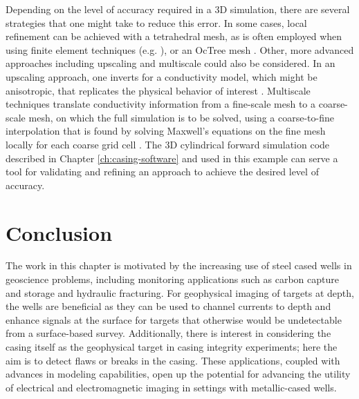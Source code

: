 Depending on the level of accuracy required in a 3D simulation, there are several strategies that one might take to reduce this error. In some cases, local refinement can be achieved with a tetrahedral mesh, as is often employed when using finite element techniques (e.g. \cite{Weiss2016}), or an OcTree mesh \citep{Haber2007}. Other, more advanced approaches including upscaling and multiscale could also be considered. In an upscaling approach, one inverts for a conductivity model, which might be anisotropic, that replicates the physical behavior of interest \citep{Caudillo-Mata2017}. Multiscale techniques translate conductivity information from a fine-scale mesh to a coarse-scale mesh, on which the full simulation is to be solved, using a coarse-to-fine interpolation that is found by solving Maxwell's equations on the fine mesh locally for each coarse grid cell \citep{Haber2014, Caudillo-Mata2017a}. The 3D cylindrical forward simulation code described in Chapter \ref{ch:casing-software} and used in this example can serve a tool for validating and refining an approach to achieve the desired level of accuracy.

\section{Conclusion}
The work in this chapter is motivated by the increasing use of steel cased wells in geoscience problems, including monitoring applications such as carbon capture and storage and hydraulic fracturing. For geophysical imaging of targets at depth, the wells are beneficial as they can be used to channel currents to depth and enhance signals at the surface for targets that otherwise would be undetectable from a surface-based survey. Additionally, there is interest in considering the casing itself as the geophysical target in casing integrity experiments; here the aim is to detect flaws or breaks in the casing. These applications, coupled with advances in modeling capabilities, open up the potential for advancing the utility of electrical and electromagnetic imaging in settings with metallic-cased wells.

